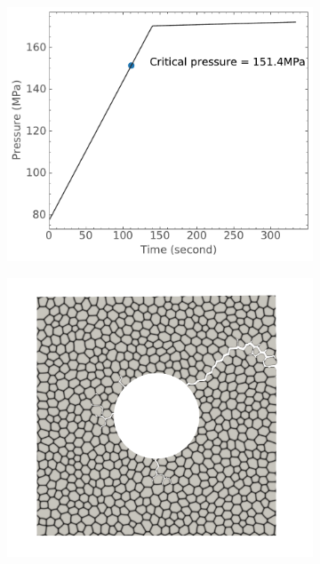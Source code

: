 \begin{figure}[htb!]
  \centering
  \begin{subfigure}[t]{0.32\linewidth}
    \centering
    \includegraphics[width=\linewidth]{Chapter3/figures/bubble_pressure_r0.5_ext60_rod196}
    \caption{}
  \end{subfigure}
  \begin{subfigure}[t]{0.32\linewidth}
    \centering
    \includegraphics[width=\linewidth]{Chapter3/figures/r5_ext60}

\end{subfigure}
\end{figure}

